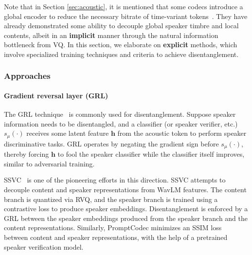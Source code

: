 Note that in Section \ref{sec:acoustic}, it is mentioned that some codecs introduce a global encoder to reduce the necessary bitrate of time-variant tokens~\cite{jiang2023disentangled,ticodec,singlecodec,zheng2024freecodecdisentangledneuralspeech}.
They have already demonstrated some ability to decouple global speaker timbre and local contents, albeit in an \textbf{implicit} manner through the natural information bottleneck from VQ.
In this section, we elaborate on \textbf{explicit} methods, which involve specialized training techniques and criteria to achieve disentanglement.

\subsubsection{Approaches}
\paragraph{Gradient reversal layer (GRL)} The GRL technique~\cite{drl} is commonly used for disentanglement. Suppose speaker information needs to be disentangled, and a classifier (or speaker verifier, etc.) $s_\mu(\cdot)$ receives some latent feature $\bm h$ from the acoustic token to perform speaker discriminative tasks. 
GRL operates by negating the gradient sign before $s_\mu(\cdot)$, thereby forcing $\bm h$ to fool the speaker classifier while the classifier itself improves, similar to adversarial training.

SSVC~\cite{SSVC} is one of the pioneering efforts in this direction.
SSVC attempts to decouple content and speaker representations from WavLM features.
The content branch is quantized via RVQ, and the speaker branch is trained using a contrastive loss to produce speaker embeddings.
Disentanglement is enforced by a GRL between the speaker embeddings produced from the speaker branch and the content representations.
Similarly, PromptCodec minimizes an SSIM loss~\cite{wang2004image} between content and speaker representations, with the help of a pretrained speaker verification model.

